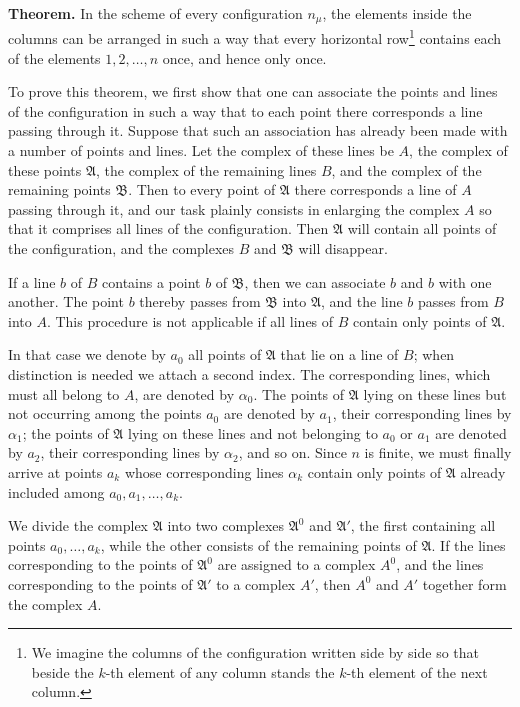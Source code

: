 \documentclass[11pt]{article}
\begin{document}
\textbf{Theorem.} In the scheme of every configuration $n_\mu$, the elements inside the columns can be arranged in such a way that every horizontal row\footnote{We imagine the columns of the configuration written side by side so that beside the $k$-th element of any column stands the $k$-th element of the next column.} contains each of the elements $1,2,\ldots,n$ once, and hence only once.

To prove this theorem, we first show that one can associate the points and lines of the configuration in such a way that to each point there corresponds a line passing through it. Suppose that such an association has already been made with a number of points and lines. Let the complex of these lines be $A$, the complex of these points $\mathfrak A$, the complex of the remaining lines $B$, and the complex of the remaining points $\mathfrak B$. Then to every point of $\mathfrak A$ there corresponds a line of $A$ passing through it, and our task plainly consists in enlarging the complex $A$ so that it comprises all lines of the configuration. Then $\mathfrak A$ will contain all points of the configuration, and the complexes $B$ and $\mathfrak B$ will disappear.

If a line $b$ of $B$ contains a point $b$ of $\mathfrak B$, then we can associate $b$ and $b$ with one another. The point $b$ thereby passes from $\mathfrak B$ into $\mathfrak A$, and the line $b$ passes from $B$ into $A$. This procedure is not applicable if all lines of $B$ contain only points of $\mathfrak A$.

In that case we denote by $a_0$ all points of $\mathfrak A$ that lie on a line of $B$; when distinction is needed we attach a second index. The corresponding lines, which must all belong to $A$, are denoted by $\alpha_0$. The points of $\mathfrak A$ lying on these lines but not occurring among the points $a_0$ are denoted by $a_1$, their corresponding lines by $\alpha_1$; the points of $\mathfrak A$ lying on these lines and not belonging to $a_0$ or $a_1$ are denoted by $a_2$, their corresponding lines by $\alpha_2$, and so on. Since $n$ is finite, we must finally arrive at points $a_k$ whose corresponding lines $\alpha_k$ contain only points of $\mathfrak A$ already included among $a_0,a_1,\ldots,a_k$.

We divide the complex $\mathfrak A$ into two complexes $\mathfrak A^0$ and $\mathfrak A'$, the first containing all points $a_0,\ldots,a_k$, while the other consists of the remaining points of $\mathfrak A$. If the lines corresponding to the points of $\mathfrak A^0$ are assigned to a complex $A^0$, and the lines corresponding to the points of $\mathfrak A'$ to a complex $A'$, then $A^0$ and $A'$ together form the complex $A$.
\end{document}
